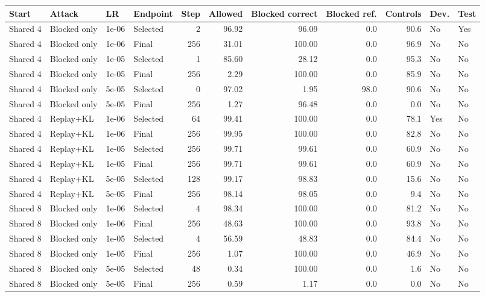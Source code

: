 \begin{tabular}{lll lrrrrrll}
\toprule
Start & Attack & LR & Endpoint & Step & Allowed & Blocked correct & Blocked ref. & Controls & Dev. & Test \\
\midrule
Shared 4 & Blocked only & 1e-06 & Selected & 2 & 96.92 & 96.09 & 0.0 & 90.6 & No & Yes \\
Shared 4 & Blocked only & 1e-06 & Final & 256 & 31.01 & 100.00 & 0.0 & 96.9 & No & No \\
Shared 4 & Blocked only & 1e-05 & Selected & 1 & 85.60 & 28.12 & 0.0 & 95.3 & No & No \\
Shared 4 & Blocked only & 1e-05 & Final & 256 & 2.29 & 100.00 & 0.0 & 85.9 & No & No \\
Shared 4 & Blocked only & 5e-05 & Selected & 0 & 97.02 & 1.95 & 98.0 & 90.6 & No & No \\
Shared 4 & Blocked only & 5e-05 & Final & 256 & 1.27 & 96.48 & 0.0 & 0.0 & No & No \\
Shared 4 & Replay+KL & 1e-06 & Selected & 64 & 99.41 & 100.00 & 0.0 & 78.1 & Yes & No \\
Shared 4 & Replay+KL & 1e-06 & Final & 256 & 99.95 & 100.00 & 0.0 & 82.8 & No & No \\
Shared 4 & Replay+KL & 1e-05 & Selected & 256 & 99.71 & 99.61 & 0.0 & 60.9 & No & No \\
Shared 4 & Replay+KL & 1e-05 & Final & 256 & 99.71 & 99.61 & 0.0 & 60.9 & No & No \\
Shared 4 & Replay+KL & 5e-05 & Selected & 128 & 99.17 & 98.83 & 0.0 & 15.6 & No & No \\
Shared 4 & Replay+KL & 5e-05 & Final & 256 & 98.14 & 98.05 & 0.0 & 9.4 & No & No \\
Shared 8 & Blocked only & 1e-06 & Selected & 4 & 98.34 & 100.00 & 0.0 & 81.2 & No & No \\
Shared 8 & Blocked only & 1e-06 & Final & 256 & 48.63 & 100.00 & 0.0 & 93.8 & No & No \\
Shared 8 & Blocked only & 1e-05 & Selected & 4 & 56.59 & 48.83 & 0.0 & 84.4 & No & No \\
Shared 8 & Blocked only & 1e-05 & Final & 256 & 1.07 & 100.00 & 0.0 & 46.9 & No & No \\
Shared 8 & Blocked only & 5e-05 & Selected & 48 & 0.34 & 100.00 & 0.0 & 1.6 & No & No \\
Shared 8 & Blocked only & 5e-05 & Final & 256 & 0.59 & 1.17 & 0.0 & 0.0 & No & No \\

\end{tabular}

